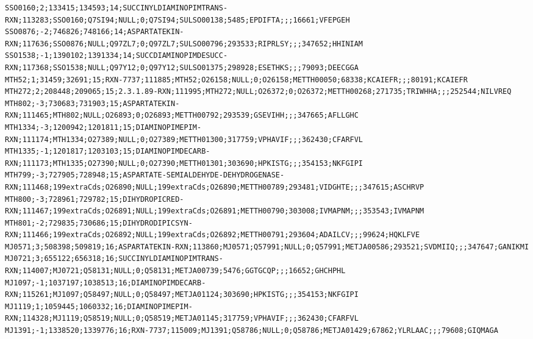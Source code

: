 \begin{adjustbox}{width=\textwidth}
\begin{lstlisting}[basicstyle=\tiny\normalfont\ttfamily,caption=LysineDAP.csv]
SSO0160;2;133415;134593;14;SUCCINYLDIAMINOPIMTRANS-RXN;113283;SSO0160;Q7SI94;NULL;0;Q7SI94;SULSO00138;5485;EPDIFTA;;;16661;VFEPGEH
SSO0876;-2;746826;748166;14;ASPARTATEKIN-RXN;117636;SSO0876;NULL;Q97ZL7;0;Q97ZL7;SULSO00796;293533;RIPRLSY;;;347652;HHINIAM
SSO1538;-1;1390102;1391334;14;SUCCDIAMINOPIMDESUCC-RXN;117368;SSO1538;NULL;Q97Y12;0;Q97Y12;SULSO01375;298928;ESETHKS;;;79093;DEECGGA
MTH52;1;31459;32691;15;RXN-7737;111885;MTH52;O26158;NULL;0;O26158;METTH00050;68338;KCAIEFR;;;80191;KCAIEFR
MTH272;2;208448;209065;15;2.3.1.89-RXN;111995;MTH272;NULL;O26372;0;O26372;METTH00268;271735;TRIWHHA;;;252544;NILVREQ
MTH802;-3;730683;731903;15;ASPARTATEKIN-RXN;111465;MTH802;NULL;O26893;0;O26893;METTH00792;293539;GSEVIHH;;;347665;AFLLGHC
MTH1334;-3;1200942;1201811;15;DIAMINOPIMEPIM-RXN;111174;MTH1334;O27389;NULL;0;O27389;METTH01300;317759;VPHAVIF;;;362430;CFARFVL
MTH1335;-1;1201817;1203103;15;DIAMINOPIMDECARB-RXN;111173;MTH1335;O27390;NULL;0;O27390;METTH01301;303690;HPKISTG;;;354153;NKFGIPI
MTH799;-3;727905;728948;15;ASPARTATE-SEMIALDEHYDE-DEHYDROGENASE-RXN;111468;199extraCds;O26890;NULL;199extraCds;O26890;METTH00789;293481;VIDGHTE;;;347615;ASCHRVP
MTH800;-3;728961;729782;15;DIHYDROPICRED-RXN;111467;199extraCds;O26891;NULL;199extraCds;O26891;METTH00790;303008;IVMAPNM;;;353543;IVMAPNM
MTH801;-2;729835;730686;15;DIHYDRODIPICSYN-RXN;111466;199extraCds;O26892;NULL;199extraCds;O26892;METTH00791;293604;ADAILCV;;;99624;HQKLFVE
MJ0571;3;508398;509819;16;ASPARTATEKIN-RXN;113860;MJ0571;Q57991;NULL;0;Q57991;METJA00586;293521;SVDMIIQ;;;347647;GANIKMI
MJ0721;3;655122;656318;16;SUCCINYLDIAMINOPIMTRANS-RXN;114007;MJ0721;Q58131;NULL;0;Q58131;METJA00739;5476;GGTGCQP;;;16652;GHCHPHL
MJ1097;-1;1037197;1038513;16;DIAMINOPIMDECARB-RXN;115261;MJ1097;Q58497;NULL;0;Q58497;METJA01124;303690;HPKISTG;;;354153;NKFGIPI
MJ1119;1;1059445;1060332;16;DIAMINOPIMEPIM-RXN;114328;MJ1119;Q58519;NULL;0;Q58519;METJA01145;317759;VPHAVIF;;;362430;CFARFVL
MJ1391;-1;1338520;1339776;16;RXN-7737;115009;MJ1391;Q58786;NULL;0;Q58786;METJA01429;67862;YLRLAAC;;;79608;GIQMAGA
\end{lstlisting}
\end{adjustbox}

